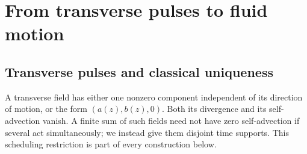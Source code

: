 \section{From transverse pulses to fluid motion}
\label{sv:imports}

\subsection{Transverse pulses and classical uniqueness}
\label{sv:analytic}
A transverse field has either one nonzero component independent of its
direction of motion, or the form $(a(z),b(z),0)$.  Both its divergence
and its self-advection vanish.  A finite sum of such fields need not have
zero self-advection if several act simultaneously; we instead give them
disjoint time supports.  This scheduling restriction is part of every
construction below.

